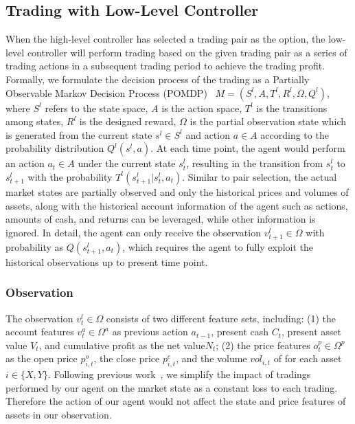 \documentclass[sigconf]{acmart}
\begin{document}
\subsection{Trading with Low-Level Controller}
When the high-level controller has selected a trading pair as the option, the low-level controller will perform trading based on the given trading pair as a series of trading actions in a subsequent trading period to achieve the trading profit.
Formally, we formulate the decision process of the trading as a Partially Observable Markov Decision Process (POMDP)~\cite{hausknecht2015deep} $M = (S^l, A, T^l, R^l, \Omega, Q^l)$, where $S^l$ refers to the state space, $A$ is the action space, $T^l$ is the transitions among states, $R^l$ is the designed reward, $\Omega$ is the partial observation state which is generated from the current state $s^l \in S^l$ and action $a \in A$ according to the probability distribution $Q^l(s^l, a)$.
At each time point, the agent would perform an action $a_t \in A$ under the current state $s^l_t$, resulting in the transition from $s^l_t$ to $s^l_{t+1}$ with the probability $T^l(s^l_{t+1}|s^l_t, a_t)$.
Similar to pair selection, the actual market states are partially observed and only the historical prices and volumes of assets, along with the historical account information of the agent such as actions, amounts of cash, and returns can be leveraged, while other information is ignored.
In detail, the agent can only receive the observation $v^l_{t+1} \in \Omega$ with probability as $Q(s^l_{t+1}, a_{t})$, which requires the agent to fully exploit the historical observations up to present time point.
	
\subsubsection{Observation}
The observation $v^l_t \in \Omega$ consists of two different feature sets, including: (1) the account features $v^a_t \in \Omega^a$ as previous action $a_{t-1}$, present cash $C_t$, present asset value $V_t$, and cumulative profit as the net value$N_t$; (2) the price features $o^p_t \in \Omega^p$ as the open price $p^o_{i,t}$, the close price $p^c_{i,t}$, and the volume $vol_{i,t}$ of for each asset $i \in \{X, Y\}$.
Following previous work~\cite{Lesmond2003TheIN}, we simplify the impact of tradings performed by our agent on the market state as a constant loss to each trading.
Therefore the action of our agent would not affect the state and price features of assets in our observation.
	
\end{document}
